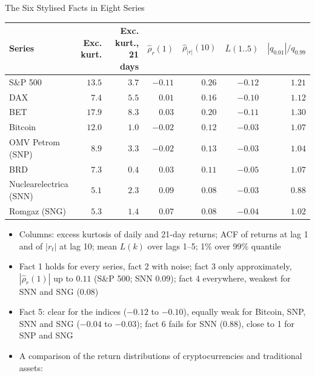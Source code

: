 \begin{frame}{The Six Stylised Facts in Eight Series}
\itemsize{\footnotesize}
\begin{center}
\scriptsize
\begin{tabular}{lrrrrrr}
\toprule
Series & Exc. kurt. & Exc. kurt., 21 days & $\hat\rho_r(1)$ & $\hat\rho_{|r|}(10)$ & $\bar L(1..5)$ & $|q_{0.01}|/q_{0.99}$ \\
\midrule
S\&P 500 & $13.5$ & $3.7$ & $-0.11$ & $0.26$ & $-0.12$ & $1.21$ \\
DAX & $7.4$ & $5.5$ & $0.01$ & $0.16$ & $-0.10$ & $1.12$ \\
BET & $17.9$ & $8.3$ & $0.03$ & $0.20$ & $-0.11$ & $1.30$ \\
Bitcoin & $12.0$ & $1.0$ & $-0.02$ & $0.12$ & $-0.03$ & $1.07$ \\
OMV Petrom (SNP) & $8.9$ & $3.3$ & $-0.02$ & $0.13$ & $-0.03$ & $1.04$ \\
BRD & $7.3$ & $0.4$ & $0.03$ & $0.11$ & $-0.05$ & $1.07$ \\
Nuclearelectrica (SNN) & $5.1$ & $2.3$ & $0.09$ & $0.08$ & $-0.03$ & $0.88$ \\
Romgaz (SNG) & $5.3$ & $1.4$ & $0.07$ & $0.08$ & $-0.04$ & $1.02$ \\
\bottomrule
\end{tabular}
\end{center}
\begin{itemize}
    \item Columns: excess kurtosis of daily and 21-day returns; ACF of returns at lag 1 and of $|r_t|$ at lag 10; mean $L(k)$ over lags 1--5; 1\% over 99\% quantile
    \item Fact 1 holds for every series, fact 2 with noise; fact 3 only approximately, $|\hat\rho_r(1)|$ up to $0.11$ (S\&P 500; SNN $0.09$); fact 4 everywhere, weakest for SNN and SNG ($0.08$)
    \item Fact 5: clear for the indices ($-0.12$ to $-0.10$), equally weak for Bitcoin, SNP, SNN and SNG ($-0.04$ to $-0.03$); fact 6 fails for SNN ($0.88$), close to 1 for SNP and SNG
    \item A comparison of the return distributions of cryptocurrencies and traditional assets: 
\end{itemize}
\end{frame}

